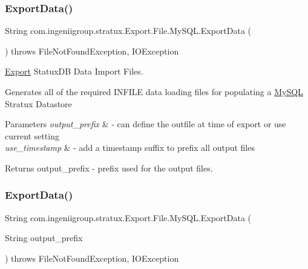 \subsubsection{\texorpdfstring{Export\+Data()}{ExportData()}\hspace{0.1cm}{\footnotesize\ttfamily [1/3]}}
{\footnotesize\ttfamily String com.\+ingeniigroup.\+stratux.\+Export.\+File.\+My\+S\+Q\+L.\+Export\+Data (\begin{DoxyParamCaption}{ }\end{DoxyParamCaption}) throws File\+Not\+Found\+Exception, I\+O\+Exception}

\hyperlink{namespacecom_1_1ingeniigroup_1_1stratux_1_1_export}{Export} Statux\+DB Data Import Files.

Generates all of the required I\+N\+F\+I\+LE data loading files for populating a \hyperlink{classcom_1_1ingeniigroup_1_1stratux_1_1_export_1_1_file_1_1_my_s_q_l}{My\+S\+QL} Stratux Datastore


\begin{DoxyParams}{Parameters}
{\em output\+\_\+prefix} & -\/ can define the outfile at time of export or use current setting \\
\hline
{\em use\+\_\+timestamp} & -\/ add a timestamp suffix to prefix all output files\\
\hline
\end{DoxyParams}
\begin{DoxyReturn}{Returns}
output\+\_\+prefix -\/ prefix used for the output files. 
\end{DoxyReturn}
\mbox{\label{classcom_1_1ingeniigroup_1_1stratux_1_1_export_1_1_file_1_1_my_s_q_l_a12f586368816e6b5130b628c21cada96}} 
\subsubsection{\texorpdfstring{Export\+Data()}{ExportData()}\hspace{0.1cm}{\footnotesize\ttfamily [2/3]}}
{\footnotesize\ttfamily String com.\+ingeniigroup.\+stratux.\+Export.\+File.\+My\+S\+Q\+L.\+Export\+Data (\begin{DoxyParamCaption}\item[{String}]{output\+\_\+prefix }\end{DoxyParamCaption}) throws File\+Not\+Found\+Exception, I\+O\+Exception}


